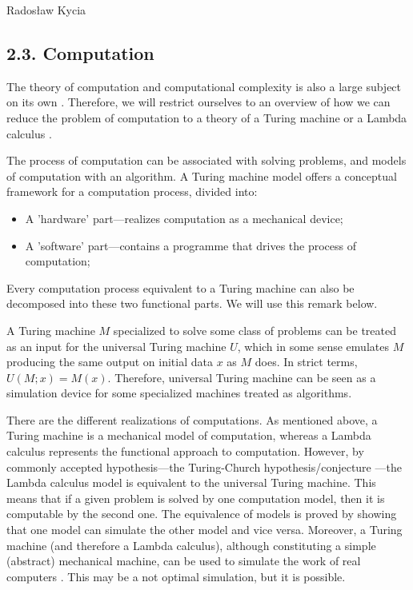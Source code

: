 \begin{artengenv}{Radosław Kycia}
\subsection{2.3. Computation}
The theory of computation and computational complexity is also a large subject on its own \parencite{HopcroftUllman}. Therefore, we will restrict ourselves to an overview of how we can reduce the problem of computation to a theory of a Turing machine or a Lambda calculus \parencite{LambdaCalculus, RosettaStone_Baez, HopcroftUllman}.

The process of computation can be associated with solving problems, and models of computation with an algorithm. A Turing machine model offers a conceptual framework for a computation process, divided into:
\begin{itemize}
 \item {A 'hardware' part---realizes computation as a mechanical device;}
 \item {A 'software' part---contains a programme that drives the process of computation;}
\end{itemize}
Every computation process equivalent to a Turing machine can also be decomposed into these two functional parts. We will use this remark below.

A Turing machine $M$ specialized to solve some class of problems can be treated as an input for the universal Turing machine $U$, which in some sense emulates $M$ producing the same output on initial data $x$ as $M$ does. In strict terms, $U(M;x) =M(x)$. Therefore, universal Turing machine can be seen as a simulation device for some specialized machines treated as algorithms. 

There are the different realizations of computations. As mentioned above, a Turing machine is a mechanical model of computation, whereas a Lambda calculus represents the functional approach to computation. However, by commonly accepted hypothesis---the Turing-Church hypothesis/conjecture \parencite{HopcroftUllman}---the Lambda calculus model is equivalent to the universal Turing machine. This means that if a given problem is solved by one computation model, then it is computable by the second one. The equivalence of models is proved by showing that one model can simulate the other model and vice versa. Moreover, a Turing machine (and therefore a Lambda calculus), although constituting a simple (abstract) mechanical machine, can be used to simulate the work of real computers \parencite{HopcroftUllman}. This may be a not optimal simulation, but it is possible. 



\end{artengenv}
